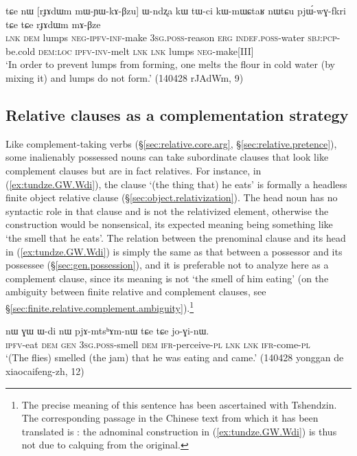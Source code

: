 \begin{exe}
\ex  \label{ex:mWYWkABzu.Wndzxa}
\gll tɕe nɯ [rɟɤdɯm mɯ-ɲɯ-kɤ-βzu] ɯ-ndʐa kɯ tɯ-ci kɯ-mɯɕtaʁ nɯtɕu pjɯ́-wɣ-fkri tɕe tɕe rɟɤdɯm mɤ-βze \\
\textsc{lnk} \textsc{dem} lumps  \textsc{neg}-\textsc{ipfv}-\textsc{inf}-make \textsc{3sg}.\textsc{poss}-reason \textsc{erg} \textsc{indef}.\textsc{poss}-water \textsc{sbj}:\textsc{pcp}-be.cold \textsc{dem}:\textsc{loc} \textsc{ipfv}-\textsc{inv}-melt \textsc{lnk} \textsc{lnk} lumps \textsc{neg}-make[III] \\
\glt `In order to prevent lumps from forming, one melts the flour in cold water (by mixing it) and lumps do not form.' (140428 rJAdWm, 9)
\end{exe} 

\subsection{Relative clauses as a complementation strategy} \label{sec:relative.clause.compl.strategy}
Like complement-taking verbs (§\ref{sec:relative.core.arg}, §\ref{sec:relative.pretence}), some inalienably possessed nouns can take subordinate clauses that look like complement clauses but are in fact relatives. For instance, in (\ref{ex:tundze.GW.Wdi}), the clause  `(the thing that) he eats' is formally a headless finite object relative clause (§\ref{sec:object.relativization}). The head noun  has no syntactic role in that clause and is not the relativized element, otherwise the construction would be nonsensical, its expected meaning being something like `the smell that he eats'. The relation between the prenominal clause and its head in (\ref{ex:tundze.GW.Wdi}) is simply the same as that between a possessor and its possessee (§\ref{sec:gen.possession}), and it is preferable not to analyze here  as a complement clause, since its meaning is not `the smell of him eating' (on the ambiguity between finite relative and complement clauses, see §\ref{sec:finite.relative.complement.ambiguity}).\footnote{The precise meaning of this sentence has been ascertained with Tshendzin. The corresponding passage in the Chinese text from which it has been translated is : the adnominal construction in (\ref{ex:tundze.GW.Wdi}) is thus not due to calquing from the original. }

\begin{exe}
\ex  \label{ex:tundze.GW.Wdi}
\gll [tu-ndze] nɯ ɣɯ ɯ-di nɯ pjɤ-mtsʰɤm-nɯ tɕe tɕe jo-ɣi-nɯ. \\
\textsc{ipfv}-eat \textsc{dem} \textsc{gen} \textsc{3sg}.\textsc{poss}-smell \textsc{dem} \textsc{ifr}-perceive-\textsc{pl} \textsc{lnk} \textsc{lnk} \textsc{ifr}-come-\textsc{pl} \\
\glt `(The flies) smelled (the jam) that he was eating and came.' (140428 yonggan de xiaocaifeng-zh, 12)
\end{exe}

